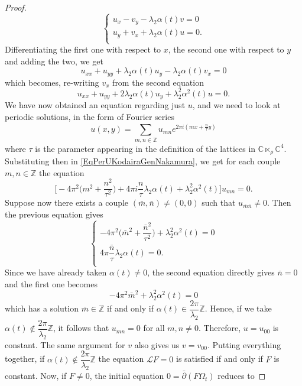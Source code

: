 \documentclass[10pt,a4paper]{amsart}
\newcommand{\C}{\mathbb{C}}
\newcommand{\delbar}{\bar{\partial}}
\begin{document}
\begin{proof}
	\[ \begin{cases}
		u_{x} - v_{y} - \lambda_{2}\alpha(t)v = 0 \\
		u_{y} + v_{x} +\lambda_{2}\alpha(t)u = 0. \\
	\end{cases} \]
	Differentiating the first one with respect to $ x $, the second one with respect to $ y $ and adding the two, we get 
	\[ u_{xx} + u_{yy} + \lambda_{2}\alpha(t)u_{y} - \lambda_{2}\alpha(t)v_{x} = 0  \]
	which becomes, re-writing $ v_{x} $ from the second equation
	\begin{equation}\label{EqPerUKodairaGenNakamura}
		u_{xx} + u_{yy} + 2\lambda_{2}\alpha(t)u_{y} + \lambda_{2}^{2}\alpha^{2}(t)u = 0.
	\end{equation} 
	We have now obtained an equation regarding just $ u $, and we need to look at periodic solutions, in the form of Fourier series
	\[ u(x,y) = \sum_{m,n \in \mathbb{Z}}^{}u_{mn}e^{2\pi i(mx + \frac{n}{\tau}y)} \]
	where $\tau$ is the parameter appearing in the definition of the lattices in $ \C \ltimes_{\rho} \C^{4} $. Substituting then in \eqref{EqPerUKodairaGenNakamura}, we get for each couple $ m,n \in \mathbb{Z} $ the equation
	\[ \bigg[-4\pi^{2}\bigg(m^{2} + \dfrac{n^{2}}{\tau^{2}}\bigg) + 4\pi i\dfrac{n}{\tau}\lambda_{2}\alpha(t) +  \lambda_{2}^{2}\alpha^{2}(t)\bigg]u_{mn} = 0. \]
	Suppose now there exists a couple $ (\bar m, \bar n) \ne (0,0) $ such that $ u_{\bar m \bar n} \ne 0 $. Then the previous equation gives
	\[ \begin{cases}
		-4\pi^{2}\bigg(\bar m^{2} + \dfrac{\bar n^{2}}{\tau^{2}}\bigg) + \lambda_{2}^{2}\alpha^{2}(t) = 0 \\[8pt]
		4\pi \dfrac{\bar n}{\tau}\lambda_{2}\alpha(t) = 0. \\
	\end{cases} \]
	Since we have already taken $ \alpha(t) \ne 0 $, the second equation directly gives $ \bar n  = 0$ and the first one becomes
	\[ -4\pi^{2}\bar m^{2} + \lambda_{2}^{2}\alpha^{2}(t) = 0 \]
	which has a solution $ \bar m \in \mathbb{Z} $ if and only if $ \alpha(t) \in  \dfrac{2\pi}{\lambda_{2}}\mathbb{Z} $. Hence, if we take $ \alpha(t) \notin  \dfrac{2\pi}{\lambda_{2}}\mathbb{Z} $, it follows that $ u_{mn} = 0 $ for all $ m,n \ne 0 $. Therefore, $ u = u_{00} $ is constant. The same argument for $ v $ also gives us $ v = v_{00} $. Putting everything together, if $  \alpha(t) \notin  \dfrac{2\pi}{\lambda_{2}}\mathbb{Z}  $ the equation $ \mathcal{L}F = 0 $ is satisfied if and only if $ F $ is constant. Now, if $ F \ne 0 $, the initial equation $ 0 = \delbar(F\Omega_{t}) $ reduces to

\end{proof}
\end{document}
